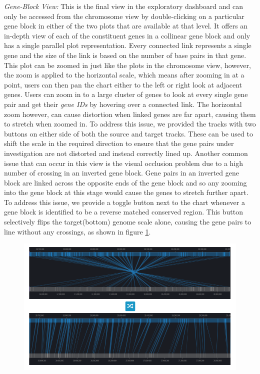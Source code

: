 \textit{Gene-Block View:} This is the final view in the exploratory dashboard and can only be accessed from the chromosome view by double-clicking on a particular gene block in either of the two plots that are available at that level. It offers an in-depth view of each of the constituent genes in a collinear gene block and only has a single parallel plot representation. Every connected link represents a single gene and the size of the link is based on the number of base pairs in that gene. This plot can be zoomed in just like the plots in the chromosome view, however, the zoom is applied to the horizontal scale, which means after zooming in at a point, users can then pan the chart either to the left or right look at adjacent genes. Users can zoom in to a large cluster of genes to look at every single gene pair and get their \textit{gene IDs} by hovering over a connected link. The horizontal zoom however, can cause distortion when linked genes are far apart, causing them to stretch when zoomed in. To address this issue, we provided the tracks with two buttons on either side of both the source and target tracks. These can be used to shift the scale in the required direction to ensure that the gene pairs under investigation are not distorted and instead correctly lined up. Another common issue that can occur in this view is the visual occlusion problem due to a high number of crossing in an inverted gene block. Gene pairs in an inverted gene block are linked across the opposite ends of the gene block and so any zooming into the gene block at this stage would cause the genes to stretch further apart. To address this issue, we provide a toggle button next to the chart whenever a gene block is identified to be a reverse matched conserved region. This button selectively flips the target(bottom) genome scale alone, causing the gene pairs to line without any crossings, as shown in figure \ref{fig:ch_5_block_view_invert}. 

\begin{figure}
  \centering
  \includegraphics[width=1\linewidth]{images/ch_5_block_view_invert.PNG}
  \label{fig:ch_5_block_view_invert}
\end{figure} 

